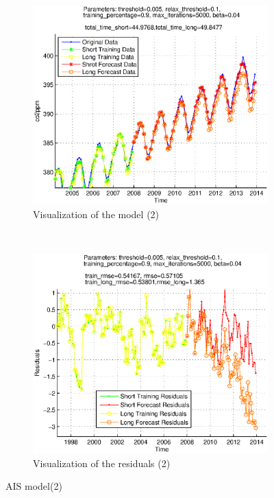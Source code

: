 \documentclass{assignment}
\begin{document}
\begin{figure}
  \begin{subfigure}[b]{0.51\textwidth}
     \includegraphics[width=\textwidth]{images/ais_visualization_0005_2.eps}
  \caption{Visualization of the model (2)}
  \end{subfigure}%
   ~ %
  \begin{subfigure}[b]{0.51\textwidth}
    \includegraphics[width=\textwidth]{images/ais_residuals_0005_2.eps}
  \caption{Visualization of the residuals (2)}
  \end{subfigure}

  \caption{AIS model(2)}
\label{fig:ais_model_0005}
\end{figure}
\end{document}
